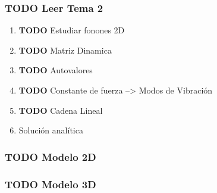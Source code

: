 \documentclass[11pt]{article}
\begin{document}
\subsubsection{{\bfseries\sffamily TODO} Leer Tema 2}
\label{sec:org9b53445}
\begin{enumerate}
\item {\bfseries\sffamily TODO} Estudiar fonones 2D
\label{sec:org8a04a81}
\item {\bfseries\sffamily TODO} Matriz Dinamica
\label{sec:orgc2f8bb4}
\item {\bfseries\sffamily TODO} Autovalores
\label{sec:orgea810c2}
\item {\bfseries\sffamily TODO} Constante de fuerza --> Modos de Vibración
\label{sec:org3403c6f}
\item {\bfseries\sffamily TODO} Cadena Lineal
\label{sec:org66260ca}
\item Solución analítica
\label{sec:orgd87e2e3}
\end{enumerate}
\subsubsection{{\bfseries\sffamily TODO} Modelo 2D}
\label{sec:org2e52e0b}
\subsubsection{{\bfseries\sffamily TODO} Modelo 3D}
\label{sec:orga00823c}
\end{document}
